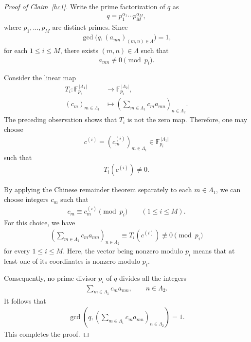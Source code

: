 \documentclass[11 pt,letterpaper]{amsart}
\theoremstyle{plain}
\theoremstyle{definition}
\theoremstyle{remark} \theoremstyle{exam} \theoremstyle{ob}
\numberwithin{equation}{section}
\begin{document}
\begin{proof}[Proof of Claim~\ref{hc1}]
	Write the prime factorization of $q$ as
	\begin{align*}
		q=p_1^{\alpha_1}\cdots p_M^{\alpha_M},
	\end{align*}
	where $p_1,\ldots,p_M$ are distinct primes. Since
	\begin{align*}
		\gcd\bigl(q,(a_{mn})_{(m,n)\in\Lambda}\bigr)=1,
	\end{align*}
	for each $1\le i\le M$, there exists
	$(m,n)\in\Lambda$ such that
	\begin{align*}
		a_{mn}\not\equiv 0\pmod{p_i}.
	\end{align*}
	
	Consider the linear map
	\begin{align*}
		T_i:\mathbb{F}_{p_i}^{\,|\Lambda_1|}
		&\longrightarrow
		\mathbb{F}_{p_i}^{\,|\Lambda_2|},\\
		(c_m)_{m\in\Lambda_1}
		&\longmapsto
		\left(
		\sum_{m\in\Lambda_1}c_ma_{mn}
		\right)_{n\in\Lambda_2}.
	\end{align*}
	The preceding observation shows that $T_i$ is not the zero map.
	Therefore, one may choose
	\begin{align*}
		c^{(i)}
		=
		(c_m^{(i)})_{m\in\Lambda_1}
		\in\mathbb{F}_{p_i}^{\,|\Lambda_1|}
	\end{align*}
	such that
	\begin{align*}
		T_i(c^{(i)})\neq 0.
	\end{align*}
	
	By applying the Chinese remainder theorem separately to each
	$m\in\Lambda_1$, we can choose integers $c_m$ such that
	\begin{align*}
		c_m\equiv c_m^{(i)}\pmod{p_i}
		\qquad
		(1\le i\le M).
	\end{align*}
	For this choice, we have
	\begin{align*}
		\left(
		\sum_{m\in\Lambda_1}c_ma_{mn}
		\right)_{n\in\Lambda_2}
		\equiv
		T_i(c^{(i)})
		\not\equiv 0
		\pmod{p_i}
	\end{align*}
	for every $1\le i\le M$. Here, the vector being nonzero modulo
	$p_i$ means that at least one of its coordinates is nonzero modulo
	$p_i$.
	
	Consequently, no prime divisor $p_i$ of $q$ divides all the integers
	\begin{align*}
		\sum_{m\in\Lambda_1}c_ma_{mn},
		\qquad n\in\Lambda_2.
	\end{align*}
	It follows that
	\begin{align*}
		\gcd\left(
		q,
		\left(
		\sum_{m\in\Lambda_1}c_ma_{mn}
		\right)_{n\in\Lambda_2}
		\right)=1.
	\end{align*}
	This completes the proof.
\end{proof}
\end{document}
